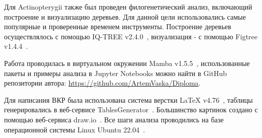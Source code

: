 Для Actinopterygii также был проведен филогенетический анализ, включающий построение и визуализацию деревьев.
Для данной цели использовались самые популярные и проверенные временем инструменты.
Построение деревьев осуществлялось с помощью IQ-TREE v2.4.0~\cite{iqtree2}, визуализация - с помощью Figtree v1.4.4~\cite{figtree}.

Работа проводилась в виртуальном окружении Mamba v1.5.5~\cite{mamba}, использованные пакеты и примеры анализа в Jupyter Notebooks можно найти в GitHub~\cite{github_general} репозитории автора: \url{https://github.com/ArtemVaska/Diploma}.

Для написания ВКР была использована система верстки LaTeX v4.76~\cite{latex}, таблицы генерировались в веб-сервисе TablesGenerator~\cite{tablesgenerator}.
Большинство картинок создано с помощью веб-сервиса draw.io~\cite{drawio}.
Все шаги анализа проводились на базе операционной системы Linux Ubuntu 22.04~\cite{ubuntu}.
